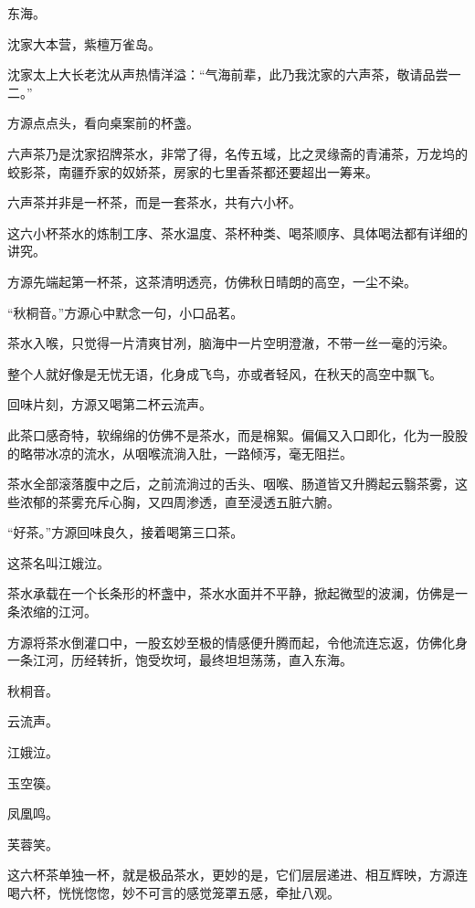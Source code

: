 
\begin{this_body}



东海。

沈家大本营，紫檀万雀岛。

沈家太上大长老沈从声热情洋溢：“气海前辈，此乃我沈家的六声茶，敬请品尝一二。”

方源点点头，看向桌案前的杯盏。

六声茶乃是沈家招牌茶水，非常了得，名传五域，比之灵缘斋的青浦茶，万龙坞的蛟影茶，南疆乔家的奴娇茶，房家的七里香茶都还要超出一筹来。

六声茶并非是一杯茶，而是一套茶水，共有六小杯。

这六小杯茶水的炼制工序、茶水温度、茶杯种类、喝茶顺序、具体喝法都有详细的讲究。

方源先端起第一杯茶，这茶清明透亮，仿佛秋日晴朗的高空，一尘不染。

“秋桐音。”方源心中默念一句，小口品茗。

茶水入喉，只觉得一片清爽甘冽，脑海中一片空明澄澈，不带一丝一毫的污染。

整个人就好像是无忧无语，化身成飞鸟，亦或者轻风，在秋天的高空中飘飞。

回味片刻，方源又喝第二杯云流声。

此茶口感奇特，软绵绵的仿佛不是茶水，而是棉絮。偏偏又入口即化，化为一股股的略带冰凉的流水，从咽喉流淌入肚，一路倾泻，毫无阻拦。

茶水全部滚落腹中之后，之前流淌过的舌头、咽喉、肠道皆又升腾起云翳茶雾，这些浓郁的茶雾充斥心胸，又四周渗透，直至浸透五脏六腑。

“好茶。”方源回味良久，接着喝第三口茶。

这茶名叫江娥泣。

茶水承载在一个长条形的杯盏中，茶水水面并不平静，掀起微型的波澜，仿佛是一条浓缩的江河。

方源将茶水倒灌口中，一股玄妙至极的情感便升腾而起，令他流连忘返，仿佛化身一条江河，历经转折，饱受坎坷，最终坦坦荡荡，直入东海。

秋桐音。

云流声。

江娥泣。

玉空篌。

凤凰鸣。

芙蓉笑。

这六杯茶单独一杯，就是极品茶水，更妙的是，它们层层递进、相互辉映，方源连喝六杯，恍恍惚惚，妙不可言的感觉笼罩五感，牵扯八观。


\end{this_body}
